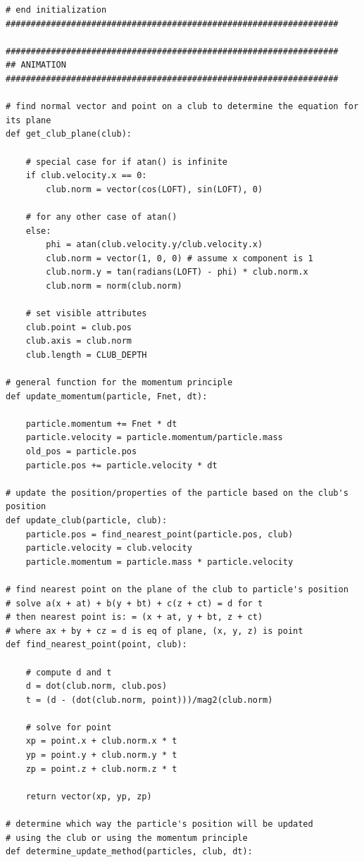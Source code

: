 \documentclass{article}
\begin{document}
\begin{verbatim}
# end initialization
##################################################################

##################################################################
## ANIMATION
##################################################################

# find normal vector and point on a club to determine the equation for its plane
def get_club_plane(club):

    # special case for if atan() is infinite
    if club.velocity.x == 0:
        club.norm = vector(cos(LOFT), sin(LOFT), 0)

    # for any other case of atan()
    else:
        phi = atan(club.velocity.y/club.velocity.x)
        club.norm = vector(1, 0, 0) # assume x component is 1
        club.norm.y = tan(radians(LOFT) - phi) * club.norm.x
        club.norm = norm(club.norm)

    # set visible attributes
    club.point = club.pos
    club.axis = club.norm
    club.length = CLUB_DEPTH

# general function for the momentum principle
def update_momentum(particle, Fnet, dt):

    particle.momentum += Fnet * dt
    particle.velocity = particle.momentum/particle.mass
    old_pos = particle.pos
    particle.pos += particle.velocity * dt

# update the position/properties of the particle based on the club's position
def update_club(particle, club):
    particle.pos = find_nearest_point(particle.pos, club)
    particle.velocity = club.velocity
    particle.momentum = particle.mass * particle.velocity

# find nearest point on the plane of the club to particle's position
# solve a(x + at) + b(y + bt) + c(z + ct) = d for t
# then nearest point is: = (x + at, y + bt, z + ct)
# where ax + by + cz = d is eq of plane, (x, y, z) is point
def find_nearest_point(point, club):
    
    # compute d and t
    d = dot(club.norm, club.pos)
    t = (d - (dot(club.norm, point)))/mag2(club.norm)

    # solve for point
    xp = point.x + club.norm.x * t
    yp = point.y + club.norm.y * t
    zp = point.z + club.norm.z * t

    return vector(xp, yp, zp)

# determine which way the particle's position will be updated
# using the club or using the momentum principle
def determine_update_method(particles, club, dt):


\end{verbatim}
\end{document}
